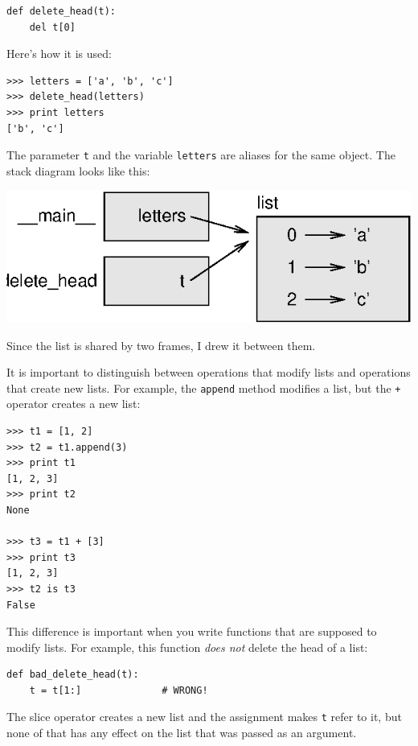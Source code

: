 \documentclass[10pt]{book}
\begin{document}
\beforeverb
\begin{verbatim}
def delete_head(t):
    del t[0]
\end{verbatim}
\afterverb
%
Here's how it is used:

\beforeverb
\begin{verbatim}
>>> letters = ['a', 'b', 'c']
>>> delete_head(letters)
>>> print letters
['b', 'c']
\end{verbatim}
\afterverb
%
The parameter {\tt t} and the variable {\tt letters} are
aliases for the same object.  The stack diagram looks like
this:


\beforefig
\centerline{\includegraphics{figs/stack5.eps}}
\afterfig

Since the list is shared by two frames, I drew
it between them.

It is important to distinguish between operations that
modify lists and operations that create new lists.  For
example, the {\tt append} method modifies a list, but the
{\tt +} operator creates a new list:


\beforeverb
\begin{verbatim}
>>> t1 = [1, 2]
>>> t2 = t1.append(3)
>>> print t1
[1, 2, 3]
>>> print t2
None

>>> t3 = t1 + [3]
>>> print t3
[1, 2, 3]
>>> t2 is t3
False
\end{verbatim}
\afterverb

This difference is important when you write functions that
are supposed to modify lists.  For example, this function
{\em does not} delete the head of a list:

\beforeverb
\begin{verbatim}
def bad_delete_head(t):
    t = t[1:]              # WRONG!
\end{verbatim}
\afterverb

The slice operator creates a new list and the assignment
makes {\tt t} refer to it, but none of that has any effect
on the list that was passed as an argument.
\end{document}
